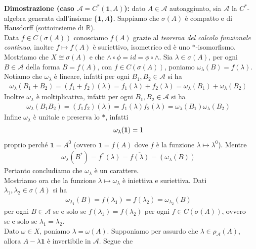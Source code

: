 \documentclass{article}
\numberwithin{equation}{subsection}
\begin{document}
\textbf{Dimostrazione (caso $\mathscr{A} = C^*(\mathbf{1}, A)$):} dato $A \in \mathscr{A}$ autoaggiunto, sia $\mathscr{A}$ la $C^*$-algebra generata dall'insieme $\{\mathbf{1}, A\}$. Sappiamo che $\sigma(A)$ è compatto e di Hausdorff (sottoinsieme di $\mathbb{R}$). \\
Data $f \in C(\sigma(A))$ conosciamo $f(A)$ grazie al \textit{teorema del calcolo funzionale continuo}, inoltre $f \mapsto f(A)$ è suriettivo, isometrico ed è uno $*$-isomorfismo. \\
Mostriamo che $X \cong \sigma(A)$ e che $\wedge \circ \phi = id = \phi \circ \wedge$. Sia $\lambda \in \sigma(A)$, per ogni $B \in \mathscr{A}$ della forma $B = f(A)$, con $f \in C(\sigma(A))$, poniamo $\omega_\lambda(B) = f(\lambda)$. Notiamo che $\omega_\lambda$ è lineare, infatti per ogni $B_1, B_2 \in \mathscr{A}$ si ha
\begin{align*}
    \omega_{\lambda}(B_1 + B_2) = (f_1 + f_2)(\lambda) = f_1(\lambda) + f_2(\lambda) = \omega_\lambda(B_1) + \omega_\lambda(B_2)
\end{align*}
Inoltre $\omega_\lambda$ è moltiplicativa, infatti per ogni $B_1, B_2 \in \mathscr{A}$ si ha
\begin{align*}
    \omega_\lambda(B_1B_2) = (f_1f_2)(\lambda) = f_1(\lambda)f_2(\lambda) = \omega_\lambda(B_1)\omega_\lambda(B_2)
\end{align*}
Infine $\omega_\lambda$ è unitale e preserva lo $*$, infatti 
\begin{align*}
    \omega_\lambda(\mathbf{1}) = 1 \notag
\end{align*}
proprio perché $\mathbf{1} = A^0$ (ovvero $\mathbf{1} = f(A)$ dove $f$ è la funzione $\lambda \mapsto \lambda^0$). Mentre 
\begin{align*}
    \omega_\lambda(B^*) = f^*(\lambda) = \overline{f(\lambda)} = \overline{(\omega_\lambda(B))}
\end{align*}
Pertanto concludiamo che $\omega_\lambda$ è un carattere. \\
Mostriamo ora che la funzione $\lambda \mapsto \omega_\lambda$ è iniettiva e suriettiva. Dati $\lambda_1, \lambda_2 \in \sigma(A)$ si ha 
\begin{align*}
    \omega_{\lambda_1}(B) = f(\lambda_1) = f(\lambda_2) = \omega_{\lambda_2}(B)
\end{align*}
per ogni $B \in \mathscr{A}$ se e solo se $f(\lambda_1) = f(\lambda_2)$ per ogni $f \in C(\sigma(A))$, ovvero se e solo se $\lambda_1 = \lambda_2$. \\
Dato $\omega \in X$, poniamo $\lambda = \omega(A)$. Supponiamo per assurdo che $\lambda \in \rho_{\mathscr{A}}(A)$, allora $A - \lambda\mathbf{1}$ è invertibile in $\mathscr{A}$. Segue che 
\end{document}
